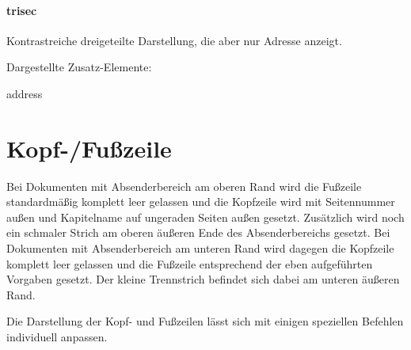   \begin{minipage}[t]{0.33\textwidth}
    \null\centering\sffamily
  \end{minipage}
  \hfill
  \begin{minipage}[t]{0.6\textwidth}
    \paragraph{trisec}
    \par
    Kontrastreiche dreigeteilte Darstellung, die aber nur Adresse anzeigt.
    \par\bigskip
    \par\bigskip
    Dargestellte Zusatz-Elemente:
    \begin{compactitem}\ttfamily
      \item address
    \end{compactitem}
  \end{minipage}


\section{Kopf-/Fußzeile}\label{sec:headline}

Bei Dokumenten mit Absenderbereich am oberen Rand wird die Fußzeile
standardmäßig komplett leer gelassen und die Kopfzeile
wird mit Seitennummer außen und Kapitelname auf ungeraden Seiten außen gesetzt.
Zusätzlich wird noch ein schmaler Strich am oberen äußeren Ende des
Absenderbereichs gesetzt.
Bei Dokumenten mit Absenderbereich am unteren Rand wird dagegen die Kopfzeile
komplett leer gelassen und die Fußzeile entsprechend der eben aufgeführten
Vorgaben gesetzt. Der kleine Trennstrich befindet sich dabei am unteren
äußeren Rand.

Die Darstellung der Kopf- und Fußzeilen lässt sich mit einigen
speziellen Befehlen individuell anpassen.

\begin{Declaration}
  \\
  \\
  \\
  \\
  \\
\end{Declaration}

